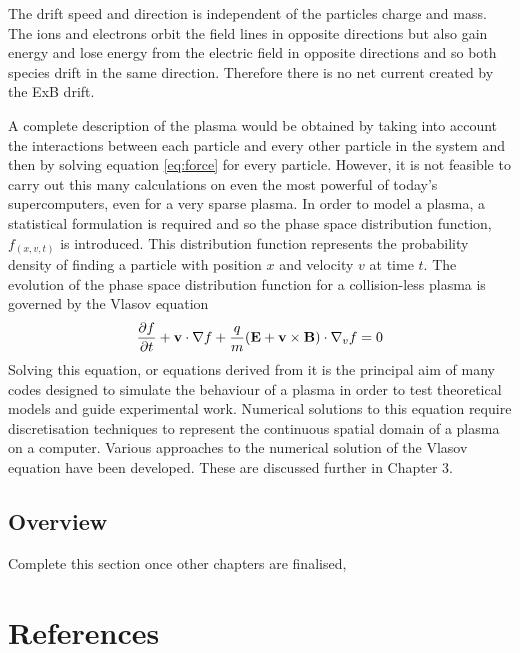 The drift speed and direction is independent of the particles charge and mass. The ions and electrons orbit the field lines in opposite directions but also gain energy and lose energy from the electric field in opposite directions and so both species drift in the same direction. Therefore there is no net current created by the ExB drift.
	






A complete description of the plasma would be obtained by taking into account the interactions between each particle and every other particle in the system and then by solving equation \ref{eq:force} for every particle. However, it is not feasible to carry out this many calculations on even the most powerful of today’s supercomputers, even for a very sparse plasma. In order to model a plasma, a statistical formulation is required and so the phase space distribution function, $f_{(x,v,t)}$ is introduced. This distribution function represents the probability density of finding a particle with position $x$ and velocity $v$ at time $t$. The evolution of the phase space distribution function for a collision-less plasma is governed by the Vlasov equation 
\begin{equation}
\frac{\partial f}{\partial t}  + \bold{v} \cdot \nabla f + \frac{q}{m} (\bold{E} + \bold{v} \times \bold{B} ) \cdot \nabla_v f = 0
\end{equation}
Solving this equation, or equations derived from it is the principal aim of many codes designed to simulate the behaviour of a plasma in order to test theoretical models and guide experimental work. Numerical solutions to this equation require discretisation techniques to represent the continuous spatial domain of a plasma on a computer. Various approaches to the numerical solution of the Vlasov equation have been developed. These are discussed further in Chapter 3.
%

	
	
	

\subsection{Overview}
Complete this section once other chapters are finalised, 	
\section{References}

 

